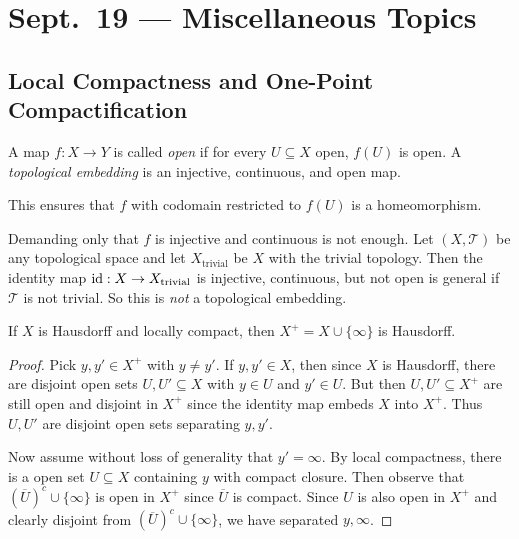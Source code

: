 \chapter{Sept.~19 --- Miscellaneous Topics}

\section{Local Compactness and One-Point Compactification}
\begin{definition}
  A map $f : X \to Y$ is called \emph{open}
  if for every $U \subseteq X$ open, $f(U)$ is open.
  A \emph{topological embedding} is an injective,
  continuous, and open map.
\end{definition}

\begin{remark}
  This ensures that $f$ with codomain restricted to
  $f(U)$ is a homeomorphism.
\end{remark}

\begin{example}
  Demanding only that $f$ is injective and continuous
  is not enough.
  Let $(X, \mathcal{T})$ be any topological space
  and let $X_{\text{trivial}}$ be $X$ with the
  trivial topology. Then the identity map
  $\operatorname{id} : X \to X_{\text{trivial}}$ is injective,
  continuous, but not open is general if $\mathcal{T}$
  is not trivial. So this is
  \emph{not} a topological embedding.
\end{example}

\begin{theorem}
  If $X$ is Hausdorff and locally compact, then
  $X^+ = X \cup \{\infty\}$ is Hausdorff.
\end{theorem}

\begin{proof}
  Pick $y, y' \in X^+$ with $y \ne y'$. If $y, y' \in X$,
  then since $X$ is Hausdorff, there are disjoint
  open sets $U, U' \subseteq X$ with $y \in U$
  and $y' \in U$. But then $U, U' \subseteq X^+$
  are still open and disjoint in $X^+$ since the identity
  map embeds $X$ into $X^+$. Thus $U, U'$ are
  disjoint open sets separating $y, y'$.

  Now assume without loss of generality that
  $y' = \infty$. By local compactness, there is a
  open set $U \subseteq X$ containing
  $y$ with compact closure. Then observe that
  $(\overline{U})^c \cup \{\infty\}$ is open in $X^+$
  since $\overline{U}$ is compact. Since $U$ is
  also open in $X^+$ and clearly disjoint from
  $(\overline{U})^c \cup \{\infty\}$, we have
  separated $y, \infty$.
\end{proof}


